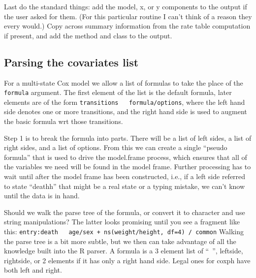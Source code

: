 \documentclass{article}
\newcommand{\code}[1]{\texttt{#1}}
\begin{document}
Last do the standard things: add the model, x, or y components to the output
if the user asked for them.  (For this particular routine I can't think of  %
a reason they every would.)  Copy across summary information from the 
rate table computation if present, and add the method and class to the
output.

\subsection{Parsing the covariates list}
For a multi-state Cox model we allow a list of formulas to take the place
of the \code{formula} argument.
The first element of the list is the default formula, later elements
are of the form \code{transitions ~ formula/options}, where the left hand side
denotes one or more transitions, and the right hand side is used to augment
the basic formula wrt those transitions.

Step 1 is to break the formula into parts.  There will be a list of left sides,
a list of right sides, and a list of options.
From this we can create a single ``pseudo formula'' that is used to drive 
the model.frame process, which ensures that all of the variables we need 
will be found in the model frame.
Further processing has to wait until after the model frame has been constructed,
i.e., if a left side referred to state ``deathh'' that might be a real state
or a typing mistake, we can't know until the data is in hand.

Should we walk the parse tree of the formula, or convert it to character and use
string manipulations?  The latter looks promising until you see a fragment 
like this:
\code{entry:death ~ age/sex + ns(weight/height, df=4) / common}
Walking the parse tree is a bit more subtle, but we then can take advantage of 
all the knowledge built into the R parser.
A formula is a 3 element list of ``~'', leftside, rightside, or 2 elements if 
it has only a right hand side.  Legal ones for coxph have both left and right.
\end{document}
